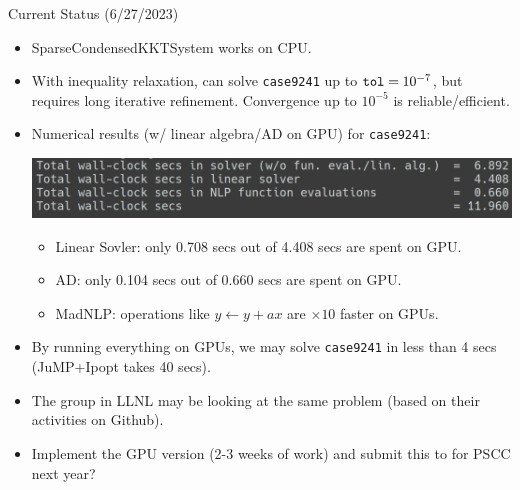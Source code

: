 \begin{frame}{Current Status (6/27/2023)}
  \begin{itemize}
  \item SparseCondensedKKTSystem works on CPU.
  \item With inequality relaxation, can solve {\tt case9241} up to ${\tt tol} = 10^{-7}$, but requires long iterative refinement. Convergence up to $10^{-5}$ is reliable/efficient.
  \item Numerical results (w/ linear algebra/AD on GPU) for {\tt case9241}:
    \begin{center}
      \includegraphics[width=.8\textwidth]{../fig/result-6-27.png}
    \end{center}
    \begin{itemize}
    \item Linear Sovler: only 0.708 secs out of 4.408 secs are spent on GPU.
    \item AD: only 0.104 secs out of 0.660 secs are spent on GPU.
    \item MadNLP: operations like $y \leftarrow y + ax$ are $\times 10$ faster on GPUs.
    \end{itemize}  
  \item By running everything on GPUs, we may solve {\tt case9241} in less than 4 secs (JuMP+Ipopt takes 40 secs).
  \item The group in LLNL may be looking at the same problem (based on their activities on Github).
  \item Implement the GPU version (2-3 weeks of work) and submit this to for PSCC next year?
\end{itemize}
\end{frame}

{
}





